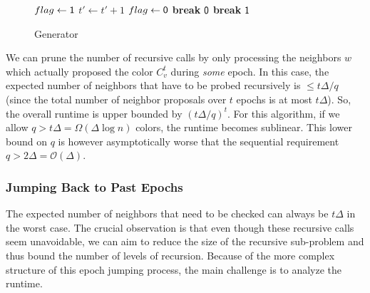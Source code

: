 \begin{wrapfigure}[19]{r}{0.48\textwidth}
\vspace{-1.5em}
\begin{framed}
    \renewcommand\figurename{Algorithm}
    \caption{Generator}
    \label{alg:coloring}
    \begin{algorithmic}[1]
                    \State {}
                \EndIf
                        \State $flag\gets \mathsf{1}$
                            \State $t'\gets t' + 1$
                                \State $flag\gets \mathsf{0}$
                                \State \textbf{break}
                            \EndIf
                        \EndWhile
                            \State \Return $\mathsf{0}$
                        \EndIf
                        \State \textbf{break}
                   \EndIf
                \EndFor
            \EndFor
            \State \Return $\mathsf{1}$
        \EndProcedure
    \end{algorithmic}
\end{framed}
\end{wrapfigure}

We can prune the number of recursive calls by only processing the neighbors $w$ which actually proposed the color $C^t_v$ during \emph{some} epoch.
In this case, the expected number of neighbors that have to be probed recursively is $\le t\Delta/q$
(since the total number of neighbor proposals over $t$ epochs is at most $t\Delta$).
So, the overall runtime is upper bounded by $(t\Delta/q)^{t}$.
For this algorithm, if we allow $q > t\Delta = \Omega(\Delta\log n)$ colors, the runtime becomes sublinear.
This lower bound on $q$ is however asymptotically worse that the sequential requirement $q > 2\Delta = \mathcal O(\Delta)$.


\subsubsection{Jumping Back to Past Epochs}
\label{ssub:jumping_back_to_past_epochs}
The expected number of neighbors that need to be checked can always be $t\Delta$ in the worst case.
The crucial observation is that even though these recursive calls seem unavoidable,
we can aim to reduce the size of the recursive sub-problem and thus bound the number of levels of recursion.
Because of the more complex structure of this epoch jumping process, the main challenge is to analyze the runtime.

